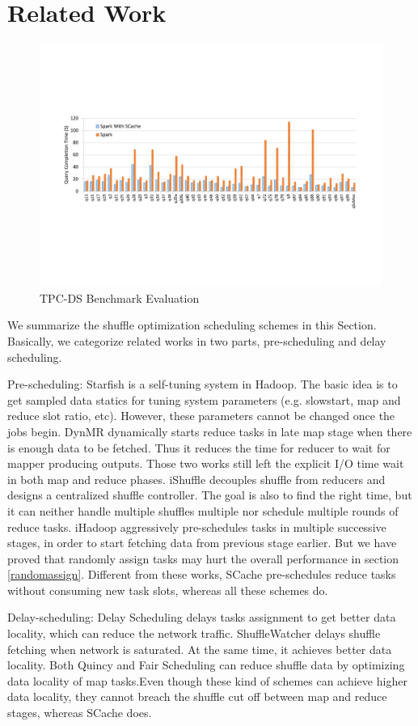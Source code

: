 \section{Related Work}

\begin{figure}
	\includegraphics[width=\textwidth]{fig/tpcds}
	\caption{TPC-DS Benchmark Evaluation}
	\label{fig:tpcds}
\end{figure}

We summarize the shuffle optimization scheduling schemes in this Section. Basically, we categorize related works in two parts, pre-scheduling and delay scheduling.

Pre-scheduling: Starfish\cite{starfish} is a self-tuning system in Hadoop. The basic idea is to get sampled data statics for tuning system parameters (e.g. slowstart, map and reduce slot ratio, etc). However, these parameters cannot be changed once the jobs begin. DynMR\cite{dynmr} dynamically starts reduce tasks in late map stage when there is enough data to be fetched. Thus it reduces the time for reducer to wait for mapper producing outputs. Those two works still left the explicit I/O time wait in both map and reduce phases. iShuffle\cite{ishuffle} decouples shuffle from reducers and designs a centralized shuffle controller. The goal is also to find the right time, but it can neither handle multiple shuffles multiple nor schedule multiple rounds of reduce tasks. iHadoop\cite{ihadoop} aggressively pre-schedules tasks in multiple successive stages, in order to start fetching data from previous stage earlier. But we have proved that randomly assign tasks may hurt the overall performance in section \ref{randomassign}. Different from these works, SCache pre-schedules reduce tasks without consuming new task slots, whereas all these schemes do.

Delay-scheduling: Delay Scheduling\cite{delay} delays tasks assignment to get better data locality, which can reduce the network traffic. ShuffleWatcher\cite{shufflewatcher} delays shuffle fetching when network is saturated. At the same time, it achieves better data locality. Both Quincy\cite{quincy} and Fair Scheduling\cite{preemptive} can reduce shuffle data by optimizing data locality of map tasks.Even though these kind of schemes can achieve higher data locality, they cannot breach the shuffle cut off between map and reduce stages, whereas SCache does. 
